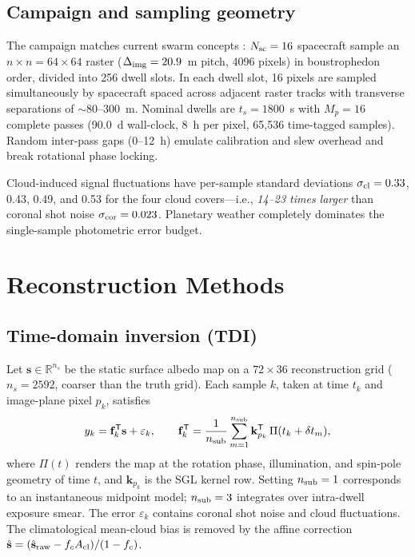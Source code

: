 \documentclass[twocolumn,10pt]{article}
\begin{document}
\subsection{Campaign and sampling geometry}
The campaign matches current swarm concepts \citep{tt22mnras,helvajian23}:
$N_{\rm sc}=16$ spacecraft sample an $n\times n=64\times64$ raster
($\Delta_{\rm img}=20.9$~m pitch, 4096 pixels) in boustrophedon order,
divided into 256 dwell slots. In each dwell slot, 16 pixels are sampled
simultaneously by spacecraft spaced across adjacent raster tracks with
transverse separations of $\sim$80--300~m. Nominal dwells are $t_s=1800$~s
with $M_p=16$ complete passes (90.0~d wall-clock, 8~h per pixel, 65,536
time-tagged samples). Random inter-pass gaps (0--12~h) emulate calibration
and slew overhead and break rotational phase locking.

Cloud-induced signal fluctuations have per-sample standard deviations
$\sigma_{\rm cl}=0.33$, 0.43, 0.49, and 0.53 for the four cloud covers---i.e.,
{\it 14--23 times larger} than coronal shot noise $\sigma_{\rm cor}=0.023$.
Planetary weather completely dominates the single-sample photometric error budget.

\section{Reconstruction Methods}
\label{sec:methods}

\subsection{Time-domain inversion (TDI)}
Let $\mathbf{s}\in\mathbb{R}^{n_s}$ be the static surface albedo map on
a $72\times36$ reconstruction grid ($n_s=2592$, coarser than the truth grid).
Each sample $k$, taken at time $t_k$ and image-plane pixel $p_k$, satisfies
\begin{equation}
y_k=\mathbf{f}_k^{\sf T}\mathbf{s}+\varepsilon_k,\qquad
\mathbf{f}_k^{\sf T}=\frac{1}{n_{\rm sub}}\sum_{m=1}^{n_{\rm sub}}\mathbf{k}_{p_k}^{\sf T}\,\Pi(t_k+\delta t_m),
\label{eq:forward}
\end{equation}
where $\Pi(t)$ renders the map at the rotation phase, illumination, and
spin-pole geometry of time $t$, and $\mathbf{k}_{p_k}$ is the SGL kernel row.
Setting $n_{\rm sub}=1$ corresponds to an instantaneous midpoint model;
$n_{\rm sub}=3$ integrates over intra-dwell exposure smear.
The error $\varepsilon_k$ contains coronal shot noise and cloud fluctuations.
The climatological mean-cloud bias is removed by the affine correction
$\hat{\mathbf{s}}=(\hat{\mathbf{s}}_{\rm raw}-f_cA_{\rm cl})/(1-f_c)$.
\end{document}
